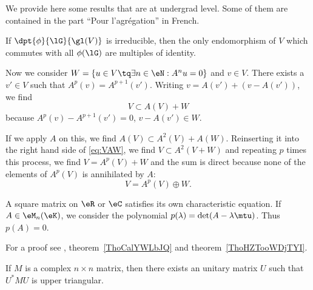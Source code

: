 
We provide here some results that are at undergrad level. Some of them are contained in the part ``Pour l'agrégation'' in French.

\begin{lemma} \label{lem:Schur}
If $\dpt{\phi}{\lG}{\gl(V)}$ is irreducible, then the only endomorphism of $V$ which commutes with all $\phi(\lG)$ are multiples of identity.
\end{lemma}

Now we consider $W=\{u\in V\tq\exists n\in\eN:A^nu=0\}$ and $v\in V$. There exists a $v'\in V$ such that $A^p(v)=A^{p+1}(v')$. Writing  $v= A(v')+(v-A(v'))$, we find
\begin{equation}\label{eq:VAW}
V\subset A(V)+W
\end{equation}
because $A^p(v)-A^{p+1}(v')=0$, $v-A(v')\in W$.

If we apply $A$ on this, we find $A(V)\subset A^2(V)+A(W)$. Reinserting it into the right hand side of \eqref{eq:VAW}, we find $V\subset A^2(V+W)$ and repeating $p$ times this process, we find $V=A^p(V)+W$ and the sum is direct because none of the elements of $A^p(V)$ is annihilated by $A$:
\begin{equation}\label{eq:ApoplusW}
V=A^p(V)\oplus W.
\end{equation}

\begin{theorem} \label{ThoCayleyHamilton}
    A square matrix on \( \eR\) or \( \eC\) satisfies its own characteristic equation. If \( A\in\eM_n(\eK)\), we consider the polynomial \( p(\lambda)=\det(A-\lambda\mtu)\). Thus \( p(A)=0\).
\end{theorem}
For a proof see , theorem~\ref{ThoCalYWLbJQ} and theorem~\ref{ThoHZTooWDjTYI}.

\begin{proposition}     \label{PropMtrDiagablaUnit}
    If \( M\) is a complex \( n\times n\) matrix, then there exists an unitary matrix \( U\) such that \( U^*MU\) is upper triangular.
\end{proposition}

